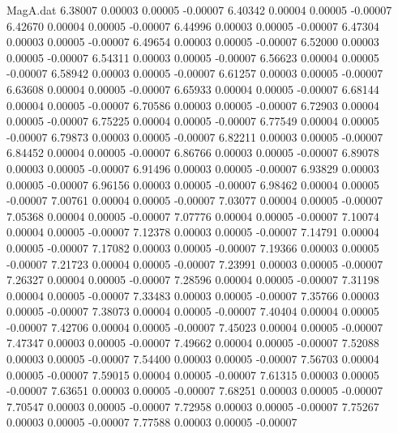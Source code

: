 \begin{filecontents}{MagA.dat}
   6.38007    0.00003    0.00005   -0.00007
   6.40342    0.00004    0.00005   -0.00007
   6.42670    0.00004    0.00005   -0.00007
   6.44996    0.00003    0.00005   -0.00007
   6.47304    0.00003    0.00005   -0.00007
   6.49654    0.00003    0.00005   -0.00007
   6.52000    0.00003    0.00005   -0.00007
   6.54311    0.00003    0.00005   -0.00007
   6.56623    0.00004    0.00005   -0.00007
   6.58942    0.00003    0.00005   -0.00007
   6.61257    0.00003    0.00005   -0.00007
   6.63608    0.00004    0.00005   -0.00007
   6.65933    0.00004    0.00005   -0.00007
   6.68144    0.00004    0.00005   -0.00007
   6.70586    0.00003    0.00005   -0.00007
   6.72903    0.00004    0.00005   -0.00007
   6.75225    0.00004    0.00005   -0.00007
   6.77549    0.00004    0.00005   -0.00007
   6.79873    0.00003    0.00005   -0.00007
   6.82211    0.00003    0.00005   -0.00007
   6.84452    0.00004    0.00005   -0.00007
   6.86766    0.00003    0.00005   -0.00007
   6.89078    0.00003    0.00005   -0.00007
   6.91496    0.00003    0.00005   -0.00007
   6.93829    0.00003    0.00005   -0.00007
   6.96156    0.00003    0.00005   -0.00007
   6.98462    0.00004    0.00005   -0.00007
   7.00761    0.00004    0.00005   -0.00007
   7.03077    0.00004    0.00005   -0.00007
   7.05368    0.00004    0.00005   -0.00007
   7.07776    0.00004    0.00005   -0.00007
   7.10074    0.00004    0.00005   -0.00007
   7.12378    0.00003    0.00005   -0.00007
   7.14791    0.00004    0.00005   -0.00007
   7.17082    0.00003    0.00005   -0.00007
   7.19366    0.00003    0.00005   -0.00007
   7.21723    0.00004    0.00005   -0.00007
   7.23991    0.00003    0.00005   -0.00007
   7.26327    0.00004    0.00005   -0.00007
   7.28596    0.00004    0.00005   -0.00007
   7.31198    0.00004    0.00005   -0.00007
   7.33483    0.00003    0.00005   -0.00007
   7.35766    0.00003    0.00005   -0.00007
   7.38073    0.00004    0.00005   -0.00007
   7.40404    0.00004    0.00005   -0.00007
   7.42706    0.00004    0.00005   -0.00007
   7.45023    0.00004    0.00005   -0.00007
   7.47347    0.00003    0.00005   -0.00007
   7.49662    0.00004    0.00005   -0.00007
   7.52088    0.00003    0.00005   -0.00007
   7.54400    0.00003    0.00005   -0.00007
   7.56703    0.00004    0.00005   -0.00007
   7.59015    0.00004    0.00005   -0.00007
   7.61315    0.00003    0.00005   -0.00007
   7.63651    0.00003    0.00005   -0.00007
   7.68251    0.00003    0.00005   -0.00007
   7.70547    0.00003    0.00005   -0.00007
   7.72958    0.00003    0.00005   -0.00007
   7.75267    0.00003    0.00005   -0.00007
   7.77588    0.00003    0.00005   -0.00007

\end{filecontents}
